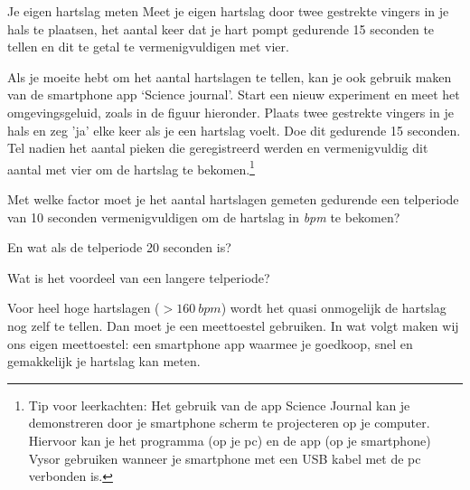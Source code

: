 \begin{opdracht}{Je eigen hartslag meten}
	Meet je eigen hartslag door twee gestrekte vingers in je hals te plaatsen, het aantal keer dat je hart pompt gedurende 15 seconden te tellen en dit te getal te vermenigvuldigen met vier.
	
	Als je moeite hebt om het aantal hartslagen te tellen, kan je ook gebruik maken van de smartphone app \textquoteleft Science journal\textquoteright. Start een nieuw experiment en meet het omgevingsgeluid, zoals in de figuur hieronder. Plaats twee gestrekte vingers in je hals en zeg 'ja' elke keer als je een hartslag voelt. Doe dit gedurende 15 seconden. Tel nadien het aantal pieken die geregistreerd werden en vermenigvuldig dit aantal met vier om de hartslag te bekomen.\footnote{Tip voor leerkachten:
	Het gebruik van de app Science Journal kan je demonstreren door je smartphone scherm te projecteren op je computer. Hiervoor kan je het programma (op je pc) en de app (op je smartphone) Vysor gebruiken wanneer je smartphone met een USB kabel met de pc verbonden is.}
	
	
\end{opdracht}

\begin{oef}
	Met welke factor moet je het aantal hartslagen gemeten gedurende een telperiode van 10 seconden vermenigvuldigen om de hartslag in \emph{bpm} te bekomen? 
	
	En wat als de telperiode 20 seconden is?
	
	Wat is het voordeel van een langere telperiode?
\end{oef}

Voor heel hoge hartslagen ($>160~bpm$) wordt het quasi onmogelijk de hartslag nog zelf te tellen. Dan moet je een meettoestel gebruiken. In wat volgt maken wij ons eigen meettoestel: een smartphone app waarmee je goedkoop, snel en gemakkelijk je hartslag kan meten.


